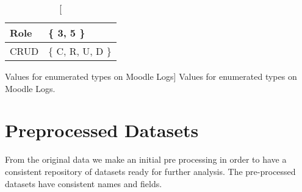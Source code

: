 \begin{table}[h!]
    \centering

    \begin{tabular}{| l | l |}
        \hline
        Role & \{ 3, 5 \} \\ \hline
        CRUD & \{ C, R, U, D \}  \\ \hline
    \end{tabular}

    \caption
        [Values for enumerated types on Moodle Logs]
        {Values for enumerated types on Moodle Logs.}

    \label{tab:moodle_logs_enum}
\end{table}

\section{Preprocessed Datasets}

From the original data we make an initial pre processing in order to have a
consistent repository of datasets ready for further analysis. The pre-processed
datasets have consistent names and fields.


\TODO{}
